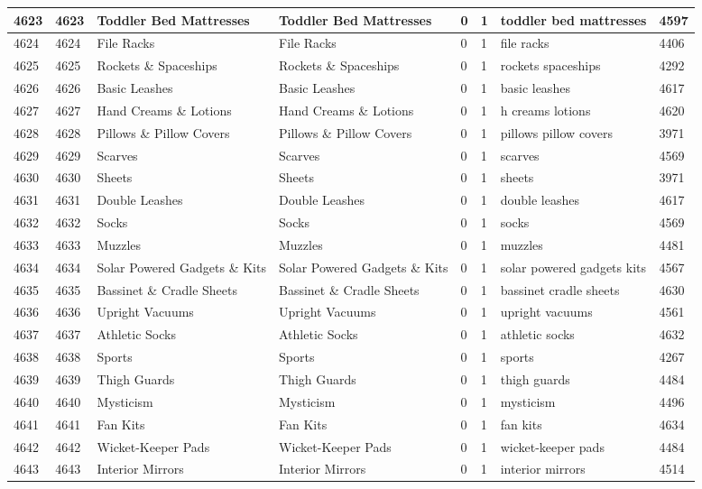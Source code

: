 \begin{longtable}{|l|l|l|l|l|l|l|l|}
4623 & 4623 & Toddler Bed Mattresses & Toddler Bed Mattresses & 0 & 1 & toddler bed mattresses & 4597 \\ \hline 
4624 & 4624 & File Racks & File Racks & 0 & 1 & file racks & 4406 \\ \hline 
4625 & 4625 & Rockets \& Spaceships & Rockets \& Spaceships & 0 & 1 & rockets spaceships & 4292 \\ \hline 
4626 & 4626 & Basic Leashes & Basic Leashes & 0 & 1 & basic leashes & 4617 \\ \hline 
4627 & 4627 & Hand Creams \& Lotions & Hand Creams \& Lotions & 0 & 1 & h creams lotions & 4620 \\ \hline 
4628 & 4628 & Pillows \& Pillow Covers & Pillows \& Pillow Covers & 0 & 1 & pillows pillow covers & 3971 \\ \hline 
4629 & 4629 & Scarves & Scarves & 0 & 1 & scarves & 4569 \\ \hline 
4630 & 4630 & Sheets & Sheets & 0 & 1 & sheets & 3971 \\ \hline 
4631 & 4631 & Double Leashes & Double Leashes & 0 & 1 & double leashes & 4617 \\ \hline 
4632 & 4632 & Socks & Socks & 0 & 1 & socks & 4569 \\ \hline 
4633 & 4633 & Muzzles & Muzzles & 0 & 1 & muzzles & 4481 \\ \hline 
4634 & 4634 & Solar Powered Gadgets \& Kits & Solar Powered Gadgets \& Kits & 0 & 1 & solar powered gadgets kits & 4567 \\ \hline 
4635 & 4635 & Bassinet \& Cradle Sheets & Bassinet \& Cradle Sheets & 0 & 1 & bassinet cradle sheets & 4630 \\ \hline 
4636 & 4636 & Upright Vacuums & Upright Vacuums & 0 & 1 & upright vacuums & 4561 \\ \hline 
4637 & 4637 & Athletic Socks & Athletic Socks & 0 & 1 & athletic socks & 4632 \\ \hline 
4638 & 4638 & Sports & Sports & 0 & 1 & sports & 4267 \\ \hline 
4639 & 4639 & Thigh Guards & Thigh Guards & 0 & 1 & thigh guards & 4484 \\ \hline 
4640 & 4640 & Mysticism & Mysticism & 0 & 1 & mysticism & 4496 \\ \hline 
4641 & 4641 & Fan Kits & Fan Kits & 0 & 1 & fan kits & 4634 \\ \hline 
4642 & 4642 & Wicket-Keeper Pads & Wicket-Keeper Pads & 0 & 1 & wicket-keeper pads & 4484 \\ \hline 
4643 & 4643 & Interior Mirrors & Interior Mirrors & 0 & 1 & interior mirrors & 4514 \\ \hline 

\end{longtable}
